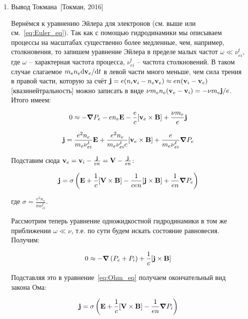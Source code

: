 \documentclass[10pt, a4paper]{article}
\newcommand{\Tokman}{~[Токман, 2016]}
\begin{document}
\begin{enumerate}
	\item Вывод Токмана\Tokman

Вернёмся к уравнению Эйлера для электронов (см. выше или см.~\eqref{eq:Euler_eq}). Так как с помощью гидродинамики мы описываем процессы на масштабах существенно более медленные, чем, например, столкновения, то запишем уравнение Эйлера в пределе малых частот $\omega \ll \nu_{ei}^t$, где $\omega$ -- характерная частота процесса, $\nu_{ei}^t$ -- частота столкновений. В таком случае слагаемое $m_en_e\dd\vb{v}_e/\dd t$ в левой части много меньше, чем сила трения в правой части, которую за счёт $\vb{j} = e (n_i \vb{v}_i - n_e \vb{v}_e)\approx e n (\vb{v}_i - \vb{v}_e)$ [квазинейтральность] можно записать в виде $\nu m_en_e(\vb{v}_e-\vb{v}_i)=-\nu m_e\vb{j}/e$. Итого имеем:

\begin{equation*}
	0 \approx -\grad{P_e} - e n_e \vb{E} - \frac{e}{c}[\vb{v}_e \times \vb{B}] + \frac{\nu m_e}{e}\vb{j}
\end{equation*}

\begin{equation} \label{eq:Ohm_eq}
	\vb{j} = \frac{e^2n_e}{m_e\nu_{ei}^t}\vb{E}+ \frac{e^2n_e}{m_e\nu_{ei}^tc}[\vb{v}_e \times \vb{B}]+\frac{e}{m_e\nu_{ei}^t}\grad{P_e}
\end{equation}

Подставим сюда $\vb{v}_e = \vb{v}_i - \frac{\vb{j}}{en} = \vb{V} - \frac{\vb{j}}{en}$:

\begin{equation*}	
	\vb{j} = \sigma \left( \vb{E} + \frac{1}{c}[\vb{V}\times\vb{B}] - \frac{1}{cen}[\vb{j}\times\vb{B}] + \frac{1}{en}\grad{P_e} \right)
\end{equation*}

где $\sigma = \frac{e^2 n_e}{m \nu_{ei}^t}$.

Рассмотрим теперь уравнение одножидкостной гидродинамики в том же приближении $\omega \ll \nu$, т.е. по сути будем искать состояние равновесия. Получим:

\begin{equation*}
	0 \approx -\grad{\left( P_e + P_i \right)} + \frac{1}{c}[\vb{j}\times\vb{B}]
\end{equation*}

Подставляя это в уравнение~\eqref{eq:Ohm_eq} получаем окончательный вид закона Ома:

\begin{equation*}
	\vb{j} = \sigma \left( \vb{E} + \frac{1}{c}[\vb{V}\times\vb{B}] - \frac{1}{en}\grad{P_i} \right)
\end{equation*}


\end{enumerate}
\end{document}
